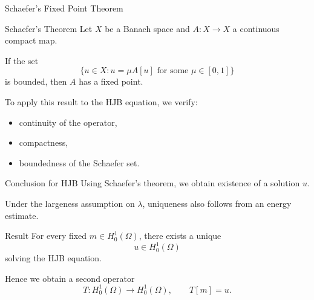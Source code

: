 \documentclass[aspectratio=169]{beamer}
\begin{document}
\begin{frame}{Schaefer's Fixed Point Theorem}

\begin{block}{Schaefer's Theorem}
Let \(X\) be a Banach space and \(A:X\to X\) a continuous compact map.

If the set
\[
\{u\in X : u = \mu A[u] \text{ for some } \mu\in[0,1]\}
\]
is bounded, then \(A\) has a fixed point.
\end{block}

\vspace{0.4cm}

To apply this result to the HJB equation, we verify:
\begin{itemize}
\item continuity of the operator,
\item compactness,
\item boundedness of the Schaefer set.
\end{itemize}

\end{frame}
\begin{frame}{Conclusion for HJB}
Using Schaefer's theorem, we obtain existence of a solution \(u\).

\vspace{0.3cm}

Under the largeness assumption on \(\lambda\), uniqueness also follows from an energy estimate.

\vspace{0.4cm}

\begin{block}{Result}
For every fixed \(m\in H_0^1(\Omega)\), there exists a unique
\[
u\in H_0^1(\Omega)
\]
solving the HJB equation.
\end{block}

\vspace{0.4cm}

Hence we obtain a second operator
\[
T : H_0^1(\Omega)\to H_0^1(\Omega), \qquad T[m]=u.
\]
\end{frame}
\end{document}
